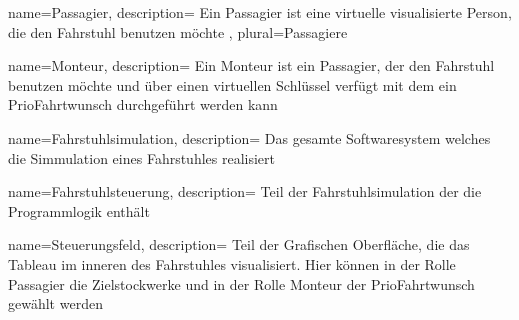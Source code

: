 {
	name=Passagier,
	description={
		Ein Passagier ist eine virtuelle visualisierte Person, die den Fahrstuhl benutzen möchte
	},
	plural=Passagiere
}

{
	name=Monteur,
	description={
		Ein Monteur ist ein \gls{Passagier}, der den Fahrstuhl benutzen möchte und über einen virtuellen Schlüssel verfügt mit dem ein \gls{PrioFahrtwunsch}
		durchgeführt werden kann
	}
}

{
	name=Fahrstuhlsimulation,
	description={
		Das gesamte Softwaresystem welches die Simmulation eines Fahrstuhles realisiert
	}
}

{
	name=Fahrstuhlsteuerung,
	description={
		Teil der Fahrstuhlsimulation der die Programmlogik enthält
	}
}

{
	name=Steuerungsfeld,
	description={
		Teil der Grafischen Oberfläche, die das Tableau im inneren des Fahrstuhles visualisiert. Hier können in der Rolle \gls{Passagier} die Zielstockwerke und in  der Rolle \gls{Monteur}  der \gls{PrioFahrtwunsch} gewählt werden
	}
}

